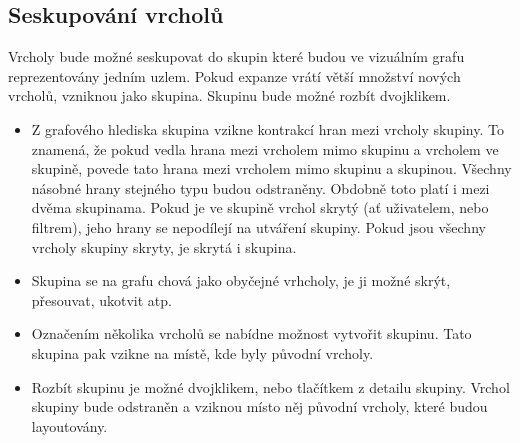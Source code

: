 \subsection{Seskupování vrcholů}
Vrcholy bude možné seskupovat do skupin které budou ve vizuálním grafu reprezentovány jedním uzlem. Pokud expanze vrátí větší množství nových vrcholů, vzniknou jako skupina. Skupinu bude možné rozbít dvojklikem.

\begin{itemize}
    \item Z grafového hlediska skupina vzikne kontrakcí hran mezi vrcholy skupiny. To znamená, že pokud vedla hrana mezi vrcholem mimo skupinu a vrcholem ve skupině, povede tato hrana mezi vrcholem mimo skupinu a skupinou. Všechny násobné hrany stejného typu budou odstraněny. Obdobně toto platí i mezi dvěma skupinama. Pokud je ve skupině vrchol skrytý (ať uživatelem, nebo filtrem), jeho hrany se nepodílejí na utváření skupiny. Pokud jsou všechny vrcholy skupiny skryty, je skrytá i skupina.
    \item Skupina se na grafu chová jako obyčejné vrhcholy, je ji možné skrýt, přesouvat, ukotvit atp.
    \item Označením několika vrcholů se nabídne možnost vytvořit skupinu. Tato skupina pak vzikne na místě, kde byly původní vrcholy.
    \item Rozbít skupinu je možné dvojklikem, nebo tlačítkem z detailu skupiny. Vrchol skupiny bude odstraněn a vziknou místo něj původní vrcholy, které budou layoutovány.
\end{itemize}
